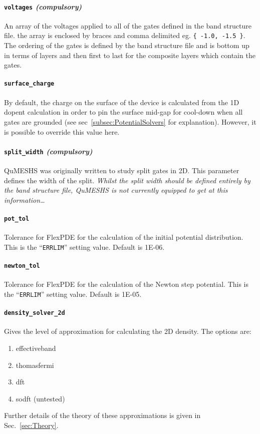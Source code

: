 \documentclass[12pt]{article}
\newcommand{\red}[1]{{\color{red} \it #1}}
\begin{document}
\paragraph{\texttt{voltages} \emph{(compulsory)}}
An array of the voltages applied to all of the gates defined in the band structure file.
the array is enclosed by braces and comma delimited eg. \texttt{\{ -1.0, -1.5 \}}.  The
ordering of the gates is defined by the band structure file and is bottom up in terms of
layers and then first to last for the composite layers which contain the gates.

\paragraph{\texttt{surface\_charge}}
By default, the charge on the surface of the device is calculated from the 1D dopent
calculation in order to pin the surface mid-gap for cool-down when all gates are grounded
(see sec~\ref{subsec:PotentialSolvers} for explanation).  However, it is possible to
override this value here.

\paragraph{\texttt{split\_width} \emph{(compulsory)}}
QuMESHS was originally written to study split gates in 2D.  This parameter defines the
width of the split.  \red{Whilst the split width should be defined entirely by the band
structure file, QuMESHS is not currently equipped to get at this information\ldots}

\paragraph{\texttt{pot\_tol}}
Tolerance for FlexPDE for the calculation of the initial potential distribution.
This is the ``\texttt{ERRLIM}'' setting value.  Default is 1E-06.

\paragraph{\texttt{newton\_tol}}
Tolerance for FlexPDE for the calculation of the Newton step potential.
This is the ``\texttt{ERRLIM}'' setting value.  Default is 1E-05.

\paragraph{\texttt{density\_solver\_2d}}
Gives the level of approximation for calculating the 2D density.  The options are:
\begin{enumerate}
    \item effectiveband
    \item thomasfermi
    \item dft
    \item sodft (untested)
\end{enumerate}
Further details of the theory of these approximations is given in Sec.~\ref{sec:Theory}.
\end{document}
